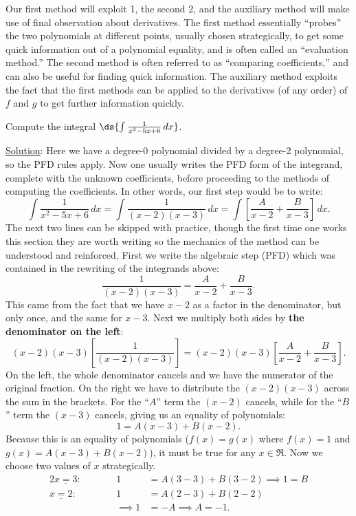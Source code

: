 Our first method will exploit 1, the second 2, and the auxiliary
method will make use of
final observation about derivatives. The first method
essentially ``probes'' the two polynomials at different points,
usually chosen strategically, to get some quick information
out of a polynomial equality, and is often called an
``evaluation method.''  The  second method is often referred to
as ``comparing coefficients,'' and can also be useful for finding
quick information.  The auxiliary method exploits the fact that
the first methods can be applied to the derivatives (of any
order) of $f$ and $g$ to get further information quickly.

\bex Compute the integral $\ds{\int\frac1{x^2-5x+6}\,dx}$.

\underline{Solution}:  Here we have a degree-0 polynomial
divided by a degree-2 polynomial,
so the PFD rules apply.  Now one usually writes the PFD form of the 
integrand, complete with the unknown coefficients, before
proceeding to the methods of computing the coefficients.  In
other words, our first step would be to write:
$$\int\frac1{x^2-5x+6}\,dx
 =\int\frac1{(x-2)(x-3)}\,dx
 =\int\left[\frac{A}{x-2}+\frac{B}{x-3}\right]\,dx.$$
The next two lines can be skipped with practice, though
the first time one works this section they are worth writing
so the mechanics of the method can be understood and reinforced.
First we write the algebraic step (PFD) which was contained in the
rewriting of the integrands above:
$$\frac1{(x-2)(x-3)}=\frac{A}{x-2}+\frac{B}{x-3}.$$
This came from the fact that we have $x-2$ as a factor in the
denominator, but only once, and the same for $x-3$.
Next we multiply both sides by {\bf the denominator on the left}:
$$(x-2)(x-3)\left[\frac1{(x-2)(x-3)}\right]
  =(x-2)(x-3)\left[\frac{A}{x-2}+\frac{B}{x-3}\right].$$
On the left, the whole denominator cancels and we have the
numerator of the original fraction.  On the right we 
have to distribute the $(x-2)(x-3)$ across the sum in the
brackets.  For the ``$A$'' term the $(x-2)$ cancels, while
for the ``$B$'' term the $(x-3)$ cancels, giving us an
equality of polynomials:
\begin{equation}1=A(x-3)+B(x-2).\label{PolyEqualityForPFD1}
\end{equation}
Because this is an equality of polynomials ($f(x)=g(x)$ where 
$f(x)=1$ and $g(x)=A(x-3)+B(x-2)$), it must be true for any 
$x\in\Re$.  Now we choose two values of $x$ strategically.
\begin{alignat*}{2}
\underline{x=3}:\qquad&& 1&=A(3-3)+B(3-2)\implies\boxed{1=B}\\
\underline{x=2}:\qquad&& 1&=A(2-3)+B(2-2)\\
              &&\implies 1&=-A\implies\boxed{A=-1}.\end{alignat*}

